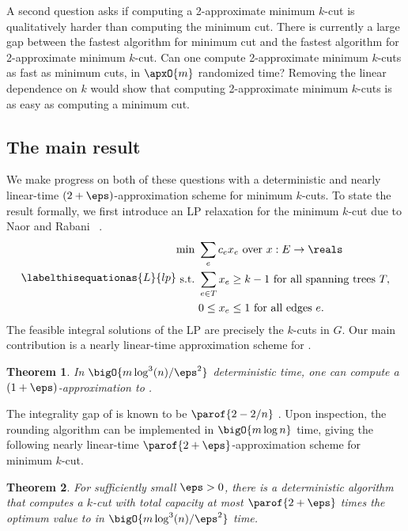 \documentclass[11pt]{article}
\numberwithin{equation}{section}
\newtheorem{theorem}{Theorem}[section]
\theoremstyle{definition}
\theoremstyle{plain}
\newcommand{\costof}[1]{c_{#1}}
\begin{document}
A second question asks if computing a 2-approximate
minimum  %
$k$-cut is
qualitatively harder than computing the minimum cut. There is
currently a large gap between the fastest algorithm for minimum cut
and the fastest algorithm for 2-approximate minimum $k$-cut. Can one
compute 2-approximate minimum $k$-cuts as fast as minimum
%
%
cuts, in %
$\apxO{m}$ randomized time?  Removing the linear dependence on $k$
would show that computing 2-approximate
minimum  %
$k$-cuts is as easy as
computing a minimum cut.

\subsection{The main result}

We make progress on both of these questions with a deterministic and
nearly %
linear-time  %
$(2 + \eps)$-approximation scheme for minimum
$k$-cuts. To state the result formally, we first introduce an LP
relaxation for the minimum $k$-cut due to %
%
Naor and Rabani%
~\cite{nr-01}.
\begin{align}
  \labelthisequationas{L}{lp}
  \begin{aligned}
    \text{min } %
    & \sum_{e} \costof{e} x_e %
    \text{ over } %
    x: E \to \reals \\
    \text{s.t.\ } & \sum_{e \in T} x_e \geq k - 1 \text{ for all
      spanning trees } T,
    \\
    & %
    0 \leq x_e \leq 1 \text{ for all edges } e.
  \end{aligned}
\end{align}
The feasible integral solutions of the LP  are
precisely the $k$-cuts in $G$.
%
Our main contribution is a   %
nearly
%
linear-time   %
approximation scheme for .

\begin{theorem}
  In $\bigO{m \log^3(n) / \eps^2}$ deterministic time, one can compute
  a $(1+\eps)$-approximation %
  to .
\end{theorem}
%
%
%
%

The integrality gap of  is known to be
$\parof{2 - 2/n}$ \cite{cgn-06,nr-01}. Upon inspection, the
rounding algorithm can be implemented in $\bigO{m \log n}$ time,
giving the following nearly %
linear-time  %
$\parof{2 + \eps}$-approximation scheme for
minimum  %
$k$-cut.

\begin{theorem}
  For sufficiently small $\eps > 0$, there is a deterministic
  algorithm that computes a $k$-cut with total capacity at most
  $\parof{2 + \eps}$ times the optimum value to  in
  $\bigO{m \log^3(n) / \eps^2}$ time.
\end{theorem}
\end{document}
